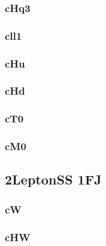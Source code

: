 \documentclass[landscape, 12pt,letterpaper]{article}
\begin{document}
\newpage

\subsubsection{cHq3}


\newpage

\subsubsection{cll1}


\newpage

\subsubsection{cHu}


\newpage

\subsubsection{cHd}


\newpage

\subsubsection{cT0}


\newpage

\subsubsection{cM0}


\newpage

\newpage

\subsection{2LeptonSS 1FJ}
\subsubsection{cW}


\newpage

\subsubsection{cHW}

\end{document}
